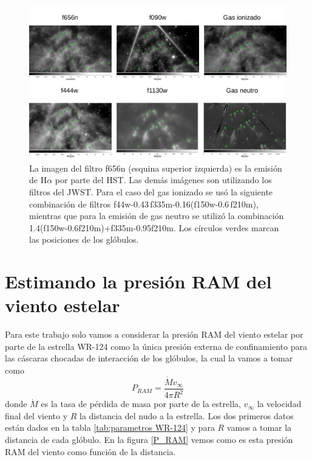\documentclass{book}
\begin{document}
\begin{figure}[htb]
    \centering
    \includegraphics[width=\textwidth]{Nuevas imagenes finales/filtros.pdf}
    \caption{La imagen del filtro f656n (esquina superior izquierda) es la emisión de H$\alpha$ por parte del HST. Las demás imágenes son utilizando los filtros del JWST. Para el caso del gas ionizado se usó la siguiente combinación de filtros f44w-0.43\,f335m-0.16(f150w-0.6\,f210m), mientras que para la emisión de gas neutro se utilizó la combinación 1.4(f150w-0.6\;f210m)+f335m-0.95\;f210m. Los círculos verdes marcan las posiciones de los glóbulos.}
    \label{fig:filters WR124}
\end{figure}

\section{Estimando la presión RAM del viento estelar}

Para este trabajo solo vamos a considerar la presión RAM del viento estelar por parte de la estrella WR-124 como la única presión externa de confinamiento para las cáscaras chocadas de interacción de los glóbulos, la cual la vamos a tomar como \begin{equation}
 P_{RAM}= \frac{\dot{M}v_\infty}{4\pi R^2}    
\end{equation}
donde $\dot{M}$ es la tasa de pérdida de masa por parte de la estrella, $v_\infty$ la velocidad final del viento y $R$ la distancia del nudo a la estrella. Los dos primeros datos están dados en la tabla \ref{tab:parametros WR-124} y para $R$ vamos a tomar la distancia de cada glóbulo. En la figura \ref{P_RAM} vemos como es esta presión RAM del viento como función de la distancia.
\end{document}
